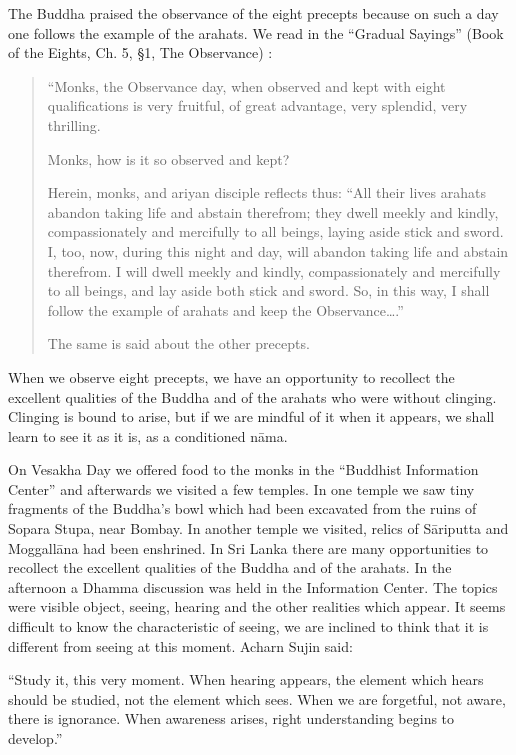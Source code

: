 The Buddha praised the observance of the eight precepts because on such
a day one follows the example of the arahats. We read in the ``Gradual
Sayings'' (Book of the Eights, Ch. 5, §1, The Observance) :

\begin{quote}
``Monks, the Observance day, when observed and kept with eight
qualifications is very fruitful, of great advantage, very splendid, very
thrilling.

Monks, how is it so observed and kept?

Herein, monks, and ariyan disciple reflects thus: ``All their lives
arahats abandon taking life and abstain therefrom; they dwell meekly and
kindly, compassionately and mercifully to all beings, laying aside stick
and sword. I, too, now, during this night and day, will abandon taking
life and abstain therefrom. I will dwell meekly and kindly,
compassionately and mercifully to all beings, and lay aside both stick
and sword. So, in this way, I shall follow the example of arahats and
keep the Observance\ldots{}.''

The same is said about the other precepts.

\end{quote}

When we observe eight precepts, we have an opportunity to recollect the
excellent qualities of the Buddha and of the arahats who were without
clinging. Clinging is bound to arise, but if we are mindful of it when
it appears, we shall learn to see it as it is, as a conditioned nāma.

On Vesakha Day we offered food to the monks in the ``Buddhist
Information Center'' and afterwards we visited a few temples. In one
temple we saw tiny fragments of the Buddha's bowl which had been
excavated from the ruins of Sopara Stupa, near Bombay. In another temple
we visited, relics of Sāriputta and Moggallāna had been enshrined. In
Sri Lanka there are many opportunities to recollect the excellent
qualities of the Buddha and of the arahats. In the afternoon a Dhamma
discussion was held in the Information Center. The topics were visible
object, seeing, hearing and the other realities which appear. It seems
difficult to know the characteristic of seeing, we are inclined to think
that it is different from seeing at this moment. Acharn Sujin said:

``Study it, this very moment. When hearing appears, the element which
hears should be studied, not the element which sees. When we are
forgetful, not aware, there is ignorance. When awareness arises, right
understanding begins to develop.''

